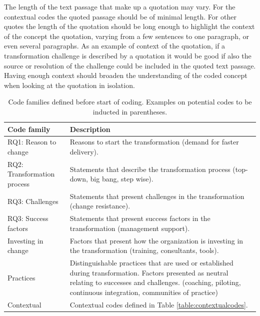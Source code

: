The length of the text passage that make up a quotation may vary. For the
contextual codes the quoted passage should be of minimal length. For other
quotes the length of the quotation should be long enough to highlight the
context of the concept the quotation, varying from a few sentences to one
paragraph, or even several paragraphs. As an example of context of the
quotation, if a transformation challenge is described by a quotation it would be
good if also the source or resolution of the challenge could be included in the
quoted text passage. Having enough context should broaden the understanding
of the coded concept when looking at the quotation in isolation.


\begin{table}
    \centering
    \begin{tabular}{ >{\raggedright\arraybackslash}p{}
                     >{\raggedright\arraybackslash}p{} }
        \toprule
        Code family          &  Description
        \\
        \midrule

        RQ1: Reason to change &
        Reasons to start the transformation (demand for faster delivery). \\

        RQ2: Transformation process &
        Statements that describe the transformation process (top-down, big bang,
        step wise). \\

        RQ3: Challenges &
        Statements that present challenges in the transformation (change resistance).
        \\

        RQ3: Success factors &
        Statements that present success factors in the transformation (management
        support).
        \\

        Investing in change  &
        Factors that present how the organization is investing in the
        transformation (training, consultants, tools). \\

        Practices &
        Distinguishable practices that are used or established during transformation.
        Factors presented as neutral relating to successes and challenges.
        (coaching, piloting, continuous integration, communities of practice) \\
        
        Contextual &
        Contextual codes defined in Table \ref{table:contextualcodes}. \\
        
        \bottomrule
    \end{tabular}
    \caption{Code families defined before start of coding. Examples on
    potential codes to be inducted in parentheses.}
    \label{table:codefamilies}
\end{table}

